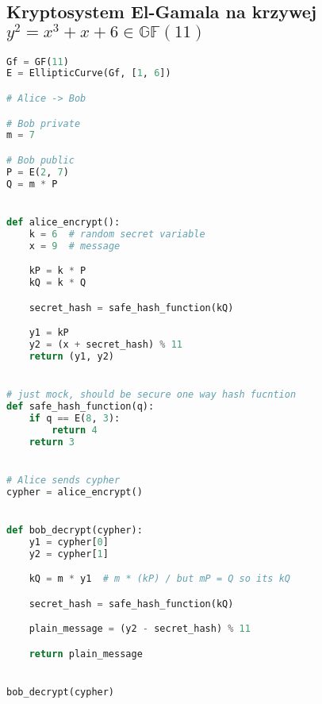 \subsection*{Kryptosystem El-Gamala na krzywej $y^2 = x^3 + x + 6 \in \mathbb{GF}(11)$ }
\begin{lstlisting}[language=python, label=sage_3, caption=Kryptosystem El-Gamala na krzywej]
Gf = GF(11)
E = EllipticCurve(Gf, [1, 6])

# Alice -> Bob

# Bob private
m = 7

# Bob public
P = E(2, 7)
Q = m * P


def alice_encrypt():
    k = 6  # random secret variable
    x = 9  # message

    kP = k * P
    kQ = k * Q

    secret_hash = safe_hash_function(kQ)

    y1 = kP
    y2 = (x + secret_hash) % 11
    return (y1, y2)


# just mock, should be secure one way hash fucntion
def safe_hash_function(q):
    if q == E(8, 3):
        return 4
    return 3


# Alice sends cypher
cypher = alice_encrypt()


def bob_decrypt(cypher):
    y1 = cypher[0]
    y2 = cypher[1]

    kQ = m * y1  # m * (kP) / but mP = Q so its kQ

    secret_hash = safe_hash_function(kQ)

    plain_message = (y2 - secret_hash) % 11

    return plain_message


bob_decrypt(cypher)
\end{lstlisting}



